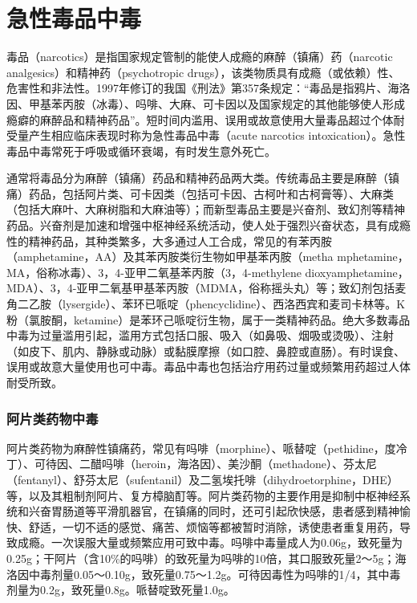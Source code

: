 \section{急性毒品中毒}

毒品（narcotics）是指国家规定管制的能使人成瘾的麻醉（镇痛）药（narcotic
analgesics）和精神药（psychotropic
drugs），该类物质具有成瘾（或依赖）性、危害性和非法性。1997年修订的我国《刑法》第357条规定：“毒品是指鸦片、海洛因、甲基苯丙胺（冰毒）、吗啡、大麻、可卡因以及国家规定的其他能够使人形成瘾癖的麻醉品和精神药品”。短时间内滥用、误用或故意使用大量毒品超过个体耐受量产生相应临床表现时称为急性毒品中毒（acute
narcotics
intoxication）。急性毒品中毒常死于呼吸或循环衰竭，有时发生意外死亡。

通常将毒品分为麻醉（镇痛）药品和精神药品两大类。传统毒品主要是麻醉（镇痛）药品，包括阿片类、可卡因类（包括可卡因、古柯叶和古柯膏等）、大麻类（包括大麻叶、大麻树脂和大麻油等）；而新型毒品主要是兴奋剂、致幻剂等精神药品。兴奋剂是加速和增强中枢神经系统活动，使人处于强烈兴奋状态，具有成瘾性的精神药品，其种类繁多，大多通过人工合成，常见的有苯丙胺（amphetamine，AA）及其苯丙胺类衍生物如甲基苯丙胺（metha
mphetamine，MA，俗称冰毒）、3，4-亚甲二氧基苯丙胺（3，4-methylene
dioxyamphetamine，MDA）、3，4-亚甲二氧基甲基苯丙胺（MDMA，俗称摇头丸）等；致幻剂包括麦角二乙胺（lysergide）、苯环已哌啶（phencyclidine）、西洛西宾和麦司卡林等。K粉（氯胺酮，ketamine）是苯环己哌啶衍生物，属于一类精神药品。绝大多数毒品中毒为过量滥用引起，滥用方式包括口服、吸入（如鼻吸、烟吸或烫吸）、注射（如皮下、肌内、静脉或动脉）或黏膜摩擦（如口腔、鼻腔或直肠）。有时误食、误用或故意大量使用也可中毒。毒品中毒也包括治疗用药过量或频繁用药超过人体耐受所致。

\subsubsection{阿片类药物中毒}

阿片类药物为麻醉性镇痛药，常见有吗啡（morphine）、哌替啶（pethidine，度冷丁）、可待因、二醋吗啡（heroin，海洛因）、美沙酮（methadone）、芬太尼（fentanyl）、舒芬太尼（sufentanil）及二氢埃托啡（dihydroetorphine，DHE）等，以及其粗制剂阿片、复方樟脑酊等。阿片类药物的主要作用是抑制中枢神经系统和兴奋胃肠道等平滑肌器官，在镇痛的同时，还可引起欣快感，患者感到精神愉快、舒适，一切不适的感觉、痛苦、烦恼等都被暂时消除，诱使患者重复用药，导致成瘾。一次误服大量或频繁应用可致中毒。吗啡中毒量成人为0.06g，致死量为0.25g；干阿片（含10\%的吗啡）的致死量为吗啡的10倍，其口服致死量2～5g；海洛因中毒剂量0.05～0.10g，致死量0.75～1.2g。可待因毒性为吗啡的1/4，其中毒剂量为0.2g，致死量0.8g。哌替啶致死量1.0g。

